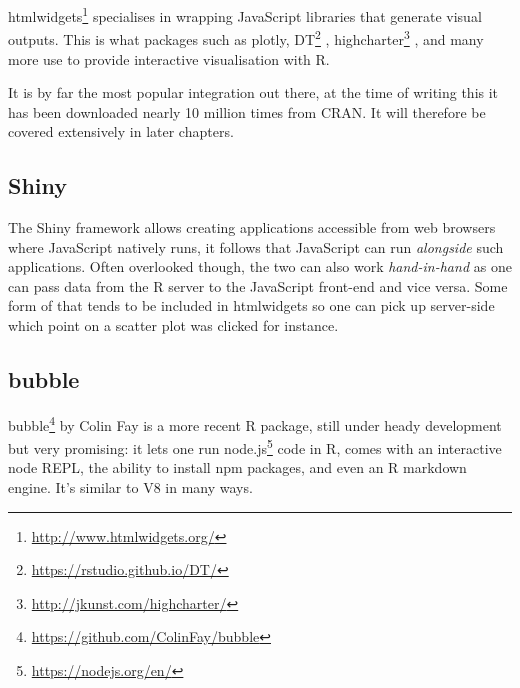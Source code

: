 \documentclass[
]{krantz}
\makeatletter
\newenvironment{Shaded}{\begin{snugshade}}{\end{snugshade}}
\newcommand{\CommentTok}[1]{\textcolor[rgb]{0.37,0.37,0.37}{\textit{#1}}}
\newcommand{\KeywordTok}[1]{\textcolor[rgb]{0.27,0.27,0.27}{\textbf{#1}}}
\newcommand{\NormalTok}[1]{#1}
\newcommand{\OperatorTok}[1]{\textcolor[rgb]{0.43,0.43,0.43}{\textbf{#1}}}
\newcommand{\StringTok}[1]{\textcolor[rgb]{0.5,0.5,0.5}{#1}}
\renewcommand{\href}[2]{#2\footnote{\url{#1}}}
\newenvironment{kframe}{%
\medskip{}
\setlength{\fboxsep}{.8em}
 \def\at@end@of@kframe{}%
 \ifinner\ifhmode%
  \def\at@end@of@kframe{\end{minipage}}%
  \begin{minipage}{\columnwidth}%
 \fi\fi%
 \def\FrameCommand##1{\hskip\@totalleftmargin \hskip-\fboxsep
 \colorbox{shadecolor}{##1}\hskip-\fboxsep
     \hskip-\linewidth \hskip-\@totalleftmargin \hskip\columnwidth}%
 \MakeFramed {\advance\hsize-\width
   \@totalleftmargin\z@ \linewidth\hsize
   \@setminipage}}%
 {\par\unskip\endMakeFramed%
 \at@end@of@kframe}
\renewenvironment{Shaded}{\begin{kframe}}{\end{kframe}}
\makeatother
\begin{document}
\href{http://www.htmlwidgets.org/}{htmlwidgets} \citep{R-htmlwidgets} specialises in wrapping JavaScript libraries that generate visual outputs. This is what packages such as plotly, \href{https://rstudio.github.io/DT/}{DT} \citep{R-DT}, \href{http://jkunst.com/highcharter/}{highcharter} \citep{R-highcharter}, and many more use to provide interactive visualisation with R.

It is by far the most popular integration out there, at the time of writing this it has been downloaded nearly 10 million times from CRAN. It will therefore be covered extensively in later chapters.

\hypertarget{shiny}{%
\subsection*{Shiny}\label{shiny}}


The Shiny framework allows creating applications accessible from web browsers where JavaScript natively runs, it follows that JavaScript can run \emph{alongside} such applications. Often overlooked though, the two can also work \emph{hand-in-hand} as one can pass data from the R server to the JavaScript front-end and vice versa. Some form of that tends to be included in htmlwidgets so one can pick up server-side which point on a scatter plot was clicked for instance.

\hypertarget{bubble}{%
\subsection*{bubble}\label{bubble}}


\href{https://github.com/ColinFay/bubble}{bubble} \citep{R-bubble} by Colin Fay is a more recent R package, still under heady development but very promising: it lets one run \href{https://nodejs.org/en/}{node.js} code in R, comes with an interactive node REPL, the ability to install npm packages, and even an R markdown engine. It's similar to V8 in many ways.

\begin{Shaded}
\end{Shaded}
\end{document}
